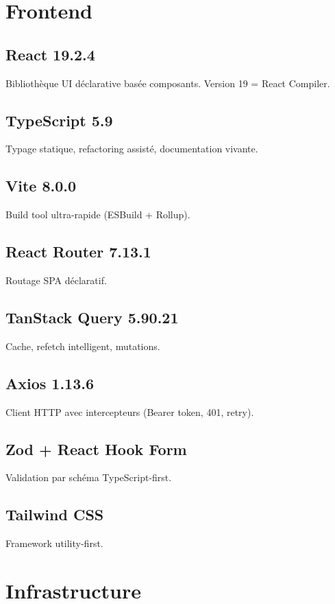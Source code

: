 \documentclass[12pt,a4paper,oneside]{report}
\begin{document}
\section{Frontend}

\subsection{React 19.2.4}
Bibliothèque UI déclarative basée composants. Version 19 = React Compiler.

\subsection{TypeScript 5.9}
Typage statique, refactoring assisté, documentation vivante.

\subsection{Vite 8.0.0}
Build tool ultra-rapide (ESBuild + Rollup).

\subsection{React Router 7.13.1}
Routage SPA déclaratif.

\subsection{TanStack Query 5.90.21}
Cache, refetch intelligent, mutations.

\subsection{Axios 1.13.6}
Client HTTP avec intercepteurs (Bearer token, 401, retry).

\subsection{Zod + React Hook Form}
Validation par schéma TypeScript-first.

\subsection{Tailwind CSS}
Framework utility-first.

\section{Infrastructure}
\end{document}

